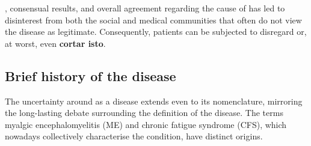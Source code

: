 , consensual results, and overall agreement regarding the cause of \cfs has led to disinterest from both the social and medical communities that often do not view the disease as legitimate. 
Consequently, patients can be subjected to disregard or, at worst, even  \textbf{cortar isto}.


\subsection{Brief history of the disease}
\label{subsec:mecfs-history}

The uncertainty around \cfs as a disease extends even to its nomenclature, mirroring the long-lasting debate surrounding the definition of the disease. The terms myalgic encephalomyelitis (ME) and chronic fatigue syndrome (CFS), which nowadays collectively characterise the condition, have distinct origins.%

